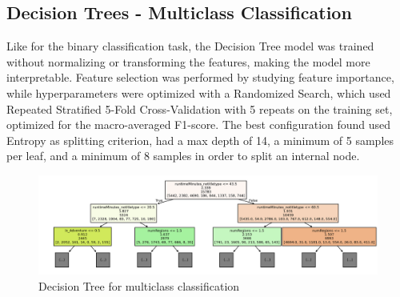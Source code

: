 \subsection{Decision Trees - Multiclass Classification}
Like for the binary classification task, the Decision Tree model was trained without normalizing or
transforming the features, making the model more interpretable. Feature selection was performed by studying
feature importance, while hyperparameters were optimized with a Randomized Search,
which used Repeated Stratified 5-Fold Cross-Validation with 5 repeats on the training set, optimized for
the macro-averaged F1-score.
The best configuration found used Entropy as splitting criterion, had a max depth of 14, a minimum of
5 samples per leaf, and a minimum of 8 samples in order to split an internal node.
\begin{figure}[H]
    \centering
    \includegraphics[width=0.88\linewidth]{plots/multiclass_tree.png}
    \captionsetup{justification=centering, width=0.9\linewidth}
    \caption{Decision Tree for multiclass classification}
    \label{fig:multiclass_dt}
\end{figure}

